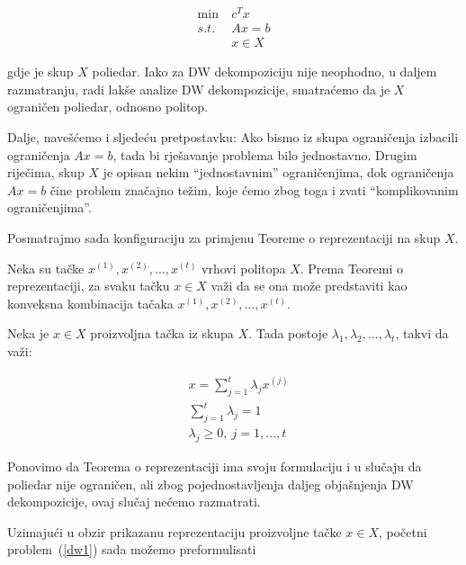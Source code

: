 \documentclass[a4paper, utf8, 11pt, colorlinks]{book}
\begin{document}
  \begin{equation}
 	\begin{aligned}\label{dw1}
 		\min\  &c^Tx\\
 		s.t.\  &Ax=b\\
 		&x \in X
 	\end{aligned}
 \end{equation}
 
 gdje je skup $X$ poliedar. Iako za DW dekompoziciju nije neophodno, u daljem razmatranju, radi lakše analize DW dekompozicije, smatraćemo da je $X$ ograničen poliedar, odnosno politop.
 
 Dalje, navešćemo i sljedeću pretpostavku: Ako bismo iz skupa ograničenja izbacili ograničenja $Ax=b$, tada bi rješavanje problema bilo jednostavno. Drugim riječima, skup $X$ je opisan nekim ``jednostavnim'' ograničenjima, dok ograničenja $Ax=b$ čine problem značajno težim, koje ćemo zbog toga i zvati ``komplikovanim ograničenjima''. 
 
 Posmatrajmo sada konfiguraciju za primjenu Teoreme o reprezentaciji na skup $X$.
 
 Neka su tačke $x^{(1)},x^{(2)},\dots,x^{(t)}$ vrhovi politopa $X$.  
 Prema Teoremi o reprezentaciji, za svaku tačku $x\in X$ važi da se ona može predstaviti kao konveksna kombinacija tačaka $x^{(1)},x^{(2)},\dots,x^{(t)}$.
 
 Neka je  $x \in X$ proizvoljna tačka iz skupa $X$.  Tada postoje $\lambda_1,\lambda_2,\ldots,\lambda_t$, takvi da važi:
 
 \begin{equation}
 	\begin{aligned}
 		&x = \sum_{j=1}^t\lambda_jx^{(j)}\\
 		 &\sum_{j=1}^t\lambda_j = 1\\
 		&\lambda_j\geqslant 0,\ j = 1,\ldots,t
 	\end{aligned}
 \end{equation}
 
 Ponovimo da Teorema o reprezentaciji ima svoju formulaciju i u slučaju da poliedar nije ograničen, ali zbog pojednostavljenja daljeg objašnjenja DW dekompozicije, ovaj slučaj nećemo razmatrati.
 
 Uzimajući u obzir prikazanu reprezentaciju proizvoljne tačke $x\in X$, početni problem~(\ref{dw1}) sada možemo preformulisati 
 
\end{document}
